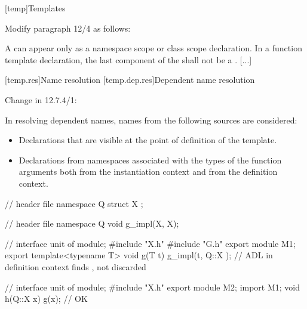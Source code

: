 \setcounter{chapter}{11}
[temp]{Templates}%

\noindent
Modify paragraph 12/4 as follows:
\begin{std.txt}
  \pnum[4]
  A  can appear only as a 
  namespace scope or class scope declaration.
  In a function template declaration, the last component of the 
   shall not be a . 
  [...]
\end{std.txt}






\setcounter{section}{6}
[temp.res]{Name resolution}
\setcounter{subsection}{3}
[temp.dep.res]{Dependent name resolution}

Change in 12.7.4/1:

\begin{std.txt}
\pnum[1]
In resolving dependent names, names from the following sources are considered:
\begin{itemize}
\item
Declarations that are visible at the point of definition of the template.
\item
Declarations from namespaces associated with the types of the function
arguments both from the instantiation context
 \added{(\ref{module.context})}
and from the definition context.
\end{itemize}
\enterexample\color{addclr}
\begin{codeblock}
// header file 
namespace Q { 
  struct X { };
}

// header file 
namespace Q {
  void g_impl(X, X);
}

// interface unit of 
module;
#include "X.h"
#include "G.h"
export module M1;
export template<typename T>
void g(T t) {
  g_impl(t, Q::X{ });   // ADL in definition context finds ,  not discarded
}

// interface unit of 
module;
#include "X.h"
export module M2;
import M1;
void h(Q::X x) {
   g(x);                // OK
}
\end{codeblock}
\exitexample
\end{std.txt}


